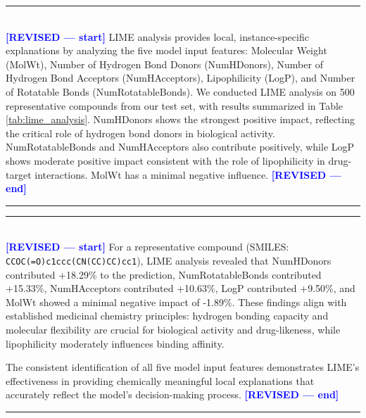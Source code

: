 \documentclass[preprint,12pt]{elsarticle}
\newcommand{\revisedstart}{\noindent\textcolor{blue}{\rule{\textwidth}{1pt}}\\\noindent\textcolor{blue}{\textbf{[REVISED --- start]}}\vspace{0.3em}}
\newcommand{\revisedend}{\vspace{0.3em}\noindent\textcolor{blue}{\textbf{[REVISED --- end]}}\\\noindent\textcolor{blue}{\rule{\textwidth}{1pt}}\vspace{0.5em}}
\begin{document}
\revisedstart
LIME analysis provides local, instance-specific explanations by analyzing the five model input features: Molecular Weight (MolWt), Number of Hydrogen Bond Donors (NumHDonors), Number of Hydrogen Bond Acceptors (NumHAcceptors), Lipophilicity (LogP), and Number of Rotatable Bonds (NumRotatableBonds). We conducted LIME analysis on 500 representative compounds from our test set, with results summarized in Table \ref{tab:lime_analysis}. NumHDonors shows the strongest positive impact, reflecting the critical role of hydrogen bond donors in biological activity. NumRotatableBonds and NumHAcceptors also contribute positively, while LogP shows moderate positive impact consistent with the role of lipophilicity in drug-target interactions. MolWt has a minimal negative influence.
\revisedend


\begin{table}[H]
\centering
\caption{LIME Feature Impact Analysis for Model Input Features}
\label{tab:lime_analysis}
\end{table}

\revisedstart
For a representative compound (SMILES: \texttt{CCOC(=O)c1ccc(CN(CC)CC)cc1}), LIME analysis revealed that NumHDonors contributed +18.29\% to the prediction, NumRotatableBonds contributed +15.33\%, NumHAcceptors contributed +10.63\%, LogP contributed +9.50\%, and MolWt showed a minimal negative impact of -1.89\%. These findings align with established medicinal chemistry principles: hydrogen bonding capacity and molecular flexibility are crucial for biological activity and drug-likeness, while lipophilicity moderately influences binding affinity.

The consistent identification of all five model input features demonstrates LIME's effectiveness in providing chemically meaningful local explanations that accurately reflect the model's decision-making process.
\revisedend
\end{document}

